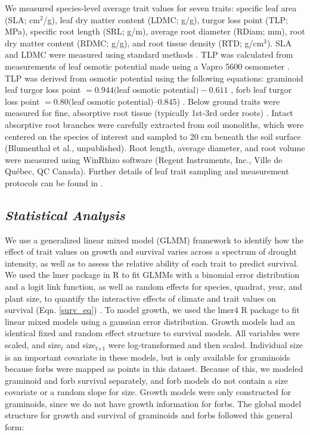 \documentclass[12pt, letterpaper]{article}
\begin{document}
We measured species-level average trait values for seven traits: specific leaf area (SLA; cm$^2$/g), leaf dry matter content (LDMC; g/g), turgor loss point (TLP; MPa), specific root length (SRL; g/m), average root diameter (RDiam; mm), root dry matter content (RDMC; g/g), and root tissue density (RTD; g/cm$^3$). SLA and LDMC were measured using standard methods \citep{Perez-Harguindeguy2013}. TLP was calculated from measurements of leaf osmotic potential made using a Vapro 5600 osmometer \citep{Bartlett2012}. TLP was derived from osmotic potential using the following equations: graminoid leaf turgor loss point $= 0.944($leaf osmotic potential$) - 0.611$ , forb leaf turgor loss point $= 0.80($leaf osmotic potential$)–0.845$) \citep{ Griffin-Nolan2019}. Below ground traits were measured for fine, absorptive root tissue (typically 1st-3rd order roots) \citep{McCormack2015}. Intact absorptive root branches were carefully extracted from soil monoliths, which were centered on the species of interest and sampled to 20 cm beneath the soil surface (Blumenthal et al., unpublished). Root length, average diameter, and root volume were measured using WinRhizo software (Regent Instruments, Inc., Ville de Québec, QC Canada). Further details of leaf trait sampling and measurement protocols can be found in \cite{Blumenthal2020}.

\subsection{\textit{Statistical Analysis}} We use a generalized linear mixed model (GLMM) framework to identify how the effect of trait values on growth and survival varies across a spectrum of drought intensity, as well as to assess the relative ability of each trait to predict survival. We used the lmer package in R to fit GLMMs with a binomial error distribution and a logit link function, as well as random effects for species, quadrat, year, and plant size, to quantify the interactive effects of climate and trait values on survival (Eqn. \ref{surv_eq}) \citep{RCoreTeam2019, Bates2015}. To model growth, we used the lmer4 R package to fit linear mixed models using a gaussian error distribution. Growth models had an identical fixed and random effect structure to survival models. All variables were scaled, and size$_\textit{t}$ and size$_\textit{t+1}$ were log-transformed and then scaled. Individual size is an important covariate in these models, but is only available for graminoids because forbs were mapped as points in this dataset. Because of this, we modeled graminoid and forb survival separately, and forb models do not contain a size covariate or a random slope for size. Growth models were only constructed for graminoids, since we do not have growth information for forbs. The global model structure for growth and survival of graminoids and forbs followed this general form:
\end{document}
